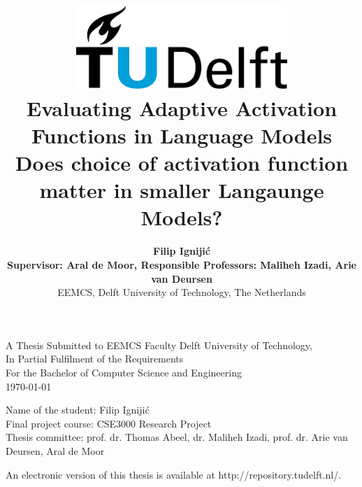 \title{
    \includegraphics[width=8cm, keepaspectratio]{tudelftlogo.png}\\
    \vspace*{2cm}
    \textbf{
         Evaluating Adaptive Activation Functions in Language Models\\
        {\large Does choice of activation function matter in smaller Langaunge Models?}
    }\\
    \vspace*{1cm}
}

\author{
     \textbf{Filip Ignijić}\\
    \hfill \break
    \textbf{Supervisor: Aral de Moor, Responsible Professors: Maliheh Izadi, Arie van Deursen}\\
    \break
    {\large 
        \hfill \break
        EEMCS, Delft University of Technology, The Netherlands
    }\\
}

\date{}

\maketitle
\thispagestyle{empty}

\let\clearpagebackup\clearpage
\renewcommand{\clearpage}{ }

\onecolumn

\vspace*{1.5cm}
\begin{center}
    A Thesis Submitted to EEMCS Faculty Delft University of Technology,\\
    In Partial Fulfilment of the Requirements\\
    For the Bachelor of Computer Science and Engineering\\
    \today
\end{center}

\vspace*{2cm}

\noindent
{\small
Name of the student: Filip Ignijić\\
Final project course: CSE3000 Research Project\\
Thesis committee: prof. dr. Thomas Abeel, dr. Maliheh Izadi, prof. dr. Arie van Deursen, Aral de Moor \\
}
\vfill

\begin{center}
    An electronic version of this thesis is available at http://repository.tudelft.nl/.
\end{center}

\twocolumn
\let\clearpage\clearpagebackup  
\clearpage
\setcounter{page}{1}
